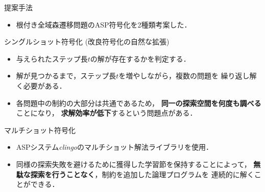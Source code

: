 \documentclass[dvipdfmx,11pt]{beamer}
\newcommand{\code}[1]{\lstinline[basicstyle=\ttfamily]{#1}}
\begin{document}
\begin{frame}{提案手法}
  \begin{itemize}
  \item 根付き全域森遷移問題のASP符号化を2種類考案した．
  \end{itemize}
  \begin{block}{シングルショット符号化 (改良符号化の自然な拡張)}
    \begin{itemize}
    \item 与えられたステップ長$t$の解が存在するかを判定する．
    \item 解が見つかるまで，ステップ長$t$を増やしながら，複数の問題を
      繰り返し解く必要がある．
    \item 各問題中の制約の大部分は共通であるため，
      \textbf{同一の探索空間を何度も調べる}ことになり，
      \textbf{求解効率が低下}するという問題点がある．
  \end{itemize}
 \end{block}
 \vfill
 \begin{alertblock}{マルチショット符号化}
   \begin{itemize}
   \item ASPシステム\textit{clingo}のマルチショット解法ライブラリを使用．
   \item 同様の探索失敗を避けるために獲得した学習節を保持することによって，
		 \textbf{無駄な探索を行うことなく}，制約を追加した論理プログラムを
		 連続的に解くことができる．
  \end{itemize}
 \end{alertblock}

\end{frame}
\end{document}

